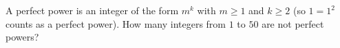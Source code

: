 A perfect power is an integer of the form $m^k$ with $m\ge1$ and $k\ge2$ (so $1=1^2$ counts as a perfect power). How many integers from $1$ to $50$ are not perfect powers?
